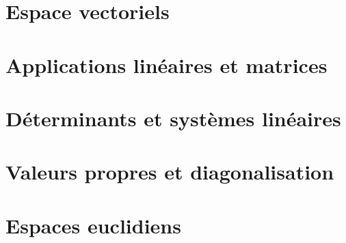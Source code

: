 \section{Espace vectoriels}


\section{Applications linéaires et matrices}


\section{Déterminants et systèmes linéaires}


\section{Valeurs propres et diagonalisation}


\section{Espaces euclidiens}
